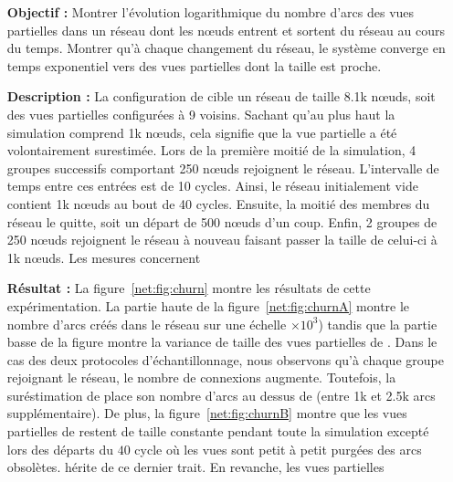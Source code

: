 \begin{itemize}
\item [\textbf{Objectif :}] Montrer l'évolution logarithmique du nombre d'arcs
  des vues partielles dans un réseau dont les nœuds entrent et sortent du réseau
  au cours du temps. Montrer qu'à chaque changement du réseau, le système
  converge en temps exponentiel vers des vues partielles dont la taille est
  proche.
\item [\textbf{Description :}] La configuration de \CYCLON cible un réseau de
  taille 8.1k nœuds, soit des vues partielles configurées à 9 voisins. Sachant
  qu'au plus haut la simulation comprend 1k nœuds, cela signifie que la vue
  partielle a été volontairement surestimée. Lors de la première moitié de la
  simulation, 4 groupes successifs comportant 250 nœuds rejoignent le
  réseau. L'intervalle de temps entre ces entrées est de 10 cycles. Ainsi, le
  réseau initialement vide contient 1k nœuds au bout de 40 cycles. Ensuite, la
  moitié des membres du réseau le quitte, soit un départ de 500 nœuds d'un
  coup. Enfin, 2 groupes de 250 nœuds rejoignent le réseau à nouveau faisant
  passer la taille de celui-ci à 1k nœuds. Les mesures concernent
\item [\textbf{Résultat :}] La figure~\ref{net:fig:churn} montre les résultats
  de cette expérimentation. La partie haute de la figure~\ref{net:fig:churnA}
  montre le nombre d'arcs créés dans le réseau sur une échelle $\times 10^3$)
  tandis que la partie basse de la figure montre la variance de taille des vues
  partielles de \SPRAY. Dans le cas des deux protocoles d'échantillonnage, nous
  observons qu'à chaque groupe rejoignant le réseau, le nombre de connexions
  augmente. Toutefois, la suréstimation de \CYCLON place son nombre d'arcs au
  dessus de \SPRAY (entre 1k et 2.5k arcs supplémentaire). De plus, la
  figure~\ref{net:fig:churnB} montre que les vues partielles de \CYCLON restent
  de taille constante pendant toute la simulation excepté lors des départs du
  $40$ cycle où les vues sont petit à petit purgées des arcs
  obsolètes. \SPRAY hérite de ce dernier trait. En revanche, les vues partielles

\end{itemize}
